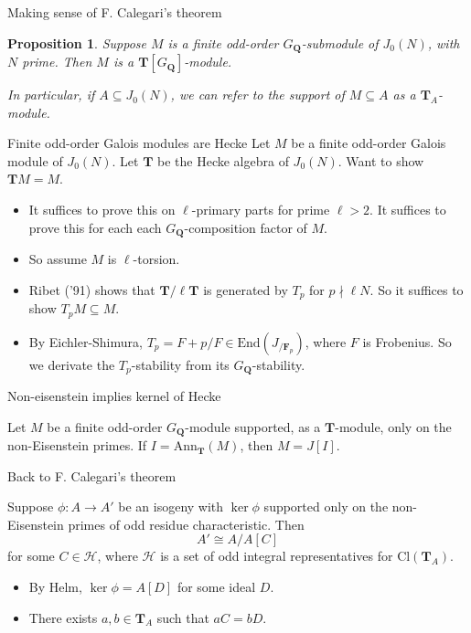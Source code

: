 \documentclass{beamer}
\newtheorem{proposition}[theorem]{Proposition}
\newcommand{\QQ}{\mathbf{Q}}
\newcommand{\TT}{\mathbf{T}}
\newcommand{\F}{\mathbf{F}}
\renewcommand{\H}{\mathcal{H}}
\newcommand{\Ann}{\mathrm{Ann}}
\newcommand{\Cl}{\mathrm{Cl}}
\newcommand{\End}{\mathrm{End}}
\begin{document}
\begin{frame}{Making sense of F. Calegari's theorem}
    \begin{proposition}
        Suppose $M$ is a finite odd-order $G_\QQ$-submodule of $J_0(N)$, with $N$
        prime. Then $M$ is a $\TT[G_\QQ]$-module.

        In particular, if $A\subseteq J_0(N)$, we can refer to the support of
        $M\subseteq A$ as a $\TT_A$-module.
    \end{proposition}
\end{frame}

\begin{frame}{Finite odd-order Galois modules are Hecke}
    Let $M$ be a finite odd-order Galois module of $J_0(N)$. Let $\TT$ be the
    Hecke algebra of $J_0(N)$. Want to show $\TT M = M$.
    \begin{itemize}
        \item
            It suffices to prove this on $\ell$-primary parts for prime
            $\ell>2$. It suffices to prove this for each each
            $G_\QQ$-composition factor of $M$.
        \item
            So assume $M$ is $\ell$-torsion.
        \item
            Ribet ('91) shows that $\TT/\ell \TT$ is generated by $T_p$ for
            $p\nmid \ell N$. So it suffices to show $T_p M \subseteq M$.
        \item
            By Eichler-Shimura, $T_p = F+p/F\in \End(J_{/\F_p})$, where $F$ is
            Frobenius. So we derivate the $T_p$-stability from its
            $G_\QQ$-stability.
    \end{itemize}
\end{frame}

\begin{frame}{Non-eisenstein implies kernel of Hecke}
    \begin{theorem}[Helm]
        Let $M$ be a finite odd-order $G_\QQ$-module supported, as a $\TT$-module,
        only on the non-Eisenstein primes. If $I=\Ann_\TT(M)$, then $M=J[I]$.
    \end{theorem}
\end{frame}

\begin{frame}{Back to F. Calegari's theorem}
    \begin{theorem}[F. Calegari]
        Suppose $\phi:A\to A'$ be an isogeny with $\ker\phi$ supported only on the
        non-Eisenstein primes of odd residue characteristic. Then
        \[
            A'\cong A/A[C]
        \]
        for some $C\in \H$, where $\H$ is a set of odd integral representatives
        for $\Cl(\TT_A)$.
    \end{theorem}
    \begin{itemize}
        \item
            By Helm, $\ker\phi=A[D]$ for some ideal $D$.
        \item
            There exists $a,b\in \TT_A$ such that $aC=bD$.
    \end{itemize}
\end{frame}
\end{document}
